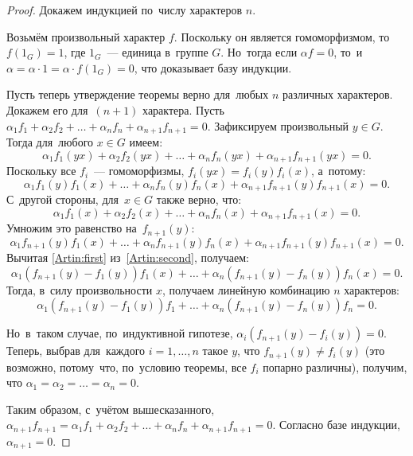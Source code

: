 \documentclass[a4paper,oneside]{article}
\begin{document}
\begin{proof}

Докажем индукцией по~числу характеров $n$.

Возьмём произвольный характер $f$. Поскольку он является гомоморфизмом,
то~$f(1_G) = 1$, где $1_G$~— единица в~группе $G$. Но~тогда если $\alpha f = 0$,
то~и~$\alpha = \alpha \cdot 1 = \alpha \cdot f(1_G) = 0$, что доказывает базу индукции.

Пусть теперь утверждение теоремы верно для~любых $n$ различных характеров. Докажем его для~$(n + 1)$ характера.
Пусть $\alpha_1 f_1 + \alpha_2 f_2 + \ldots + \alpha_n f_n + \alpha_{n + 1} f_{n + 1} = 0$.
Зафиксируем произвольный $y \in G$. Тогда для~любого $x \in G$ имеем:
\begin{equation}\label{Artin:first}
  \alpha_1 f_1(yx) + \alpha_2 f_2(yx) + \ldots + \alpha_n f_n(yx) + \alpha_{n + 1} f_{n + 1}(yx) = 0.
\end{equation}
Поскольку все $f_i$~— гомоморфизмы, $f_i(yx) = f_i(y) f_i(x)$, а~потому:
\[
  \alpha_1 f_1(y) f_1(x) + \ldots + \alpha_n f_n(y) f_n(x) + \alpha_{n + 1} f_{n + 1}(y) f_{n + 1}(x) = 0.
\]
С~другой стороны, для~$x \in G$ также верно, что:
\[
  \alpha_1 f_1(x) + \alpha_2 f_2(x) + \ldots + \alpha_n f_n(x) + \alpha_{n + 1} f_{n + 1}(x) = 0.
\]
Умножим это равенство на~$f_{n + 1}(y)$:
\begin{equation}\label{Artin:second}
  \alpha_1 f_{n + 1}(y) f_1(x) + \ldots + \alpha_n f_{n + 1}(y) f_n(x) + \alpha_{n + 1} f_{n + 1}(y) f_{n + 1}(x) = 0.
\end{equation}
Вычитая \eqref{Artin:first} из~\eqref{Artin:second}, получаем:
\[
  \alpha_1 (f_{n + 1}(y) - f_1(y)) f_1(x) + \ldots + \alpha_n (f_{n + 1}(y) - f_n(y)) f_n(x) = 0.
\]
Тогда, в~силу произвольности $x$, получаем линейную комбинацию $n$ характеров:
\[
  \alpha_1 (f_{n + 1}(y) - f_1(y)) f_1 + \ldots + \alpha_n (f_{n + 1}(y) - f_n(y)) f_n = 0.
\]

Но~в~таком случае, по~индуктивной гипотезе, $\alpha_i (f_{n + 1}(y) - f_i(y)) = 0$.
Теперь, выбрав для~каждого $i = 1, \ldots, n$ такое $y$, что $f_{n + 1}(y) \neq f_i(y)$
(это возможно, потому~что, по~условию теоремы, все $f_i$ попарно различны), получим,
что $\alpha_1 = \alpha_2 = \ldots = \alpha_n = 0$.

Таким образом, с~учётом вышесказанного, $\alpha_{n + 1} f_{n + 1} = \alpha_1 f_1 + \alpha_2 f_2 + \ldots + \alpha_n f_n + \alpha_{n + 1} f_{n + 1} = 0$.
Согласно базе индукции, $\alpha_{n + 1} = 0$.
\end{proof}
\end{document}
